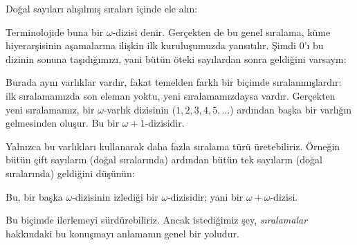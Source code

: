 


Doğal sayıları alışılmış sıraları içinde ele alın:
\begin{center}
\end{center}
Terminolojide buna bir $\omega$-dizisi denir. Gerçekten de bu genel
sıralama, küme hiyerarşisinin aşamalarına ilişkin ilk kuruluşumuzda
yansıtılır. Şimdi $0$'ı bu dizinin sonuna taşıdığımızı, yani bütün öteki
sayılardan sonra geldiğini varsayın:
\begin{center}
\end{center}
Burada aynı varlıklar vardır, fakat temelden farklı bir biçimde
sıralanmışlardır: ilk sıralamamızda son eleman yoktu, yeni sıralamamızdaysa
vardır. Gerçekten yeni sıralamamız, bir $\omega$-varlık dizisinin
($1,2,3,4,5,\ldots$) ardından başka bir varlığın gelmesinden oluşur. Bu
bir $\omega+1$-dizisidir.

Yalnızca bu varlıkları kullanarak daha fazla sıralama türü üretebiliriz.
Örneğin bütün çift sayıların (doğal sıralarında) ardından bütün tek
sayıların (doğal sıralarında) geldiğini düşünün:
\begin{center}
\end{center}
Bu, bir başka $\omega$-dizisinin izlediği bir $\omega$-dizisidir; yani
bir $\omega+\omega$-dizisi.

Bu biçimde ilerlemeyi sürdürebiliriz. Ancak istediğimiz şey,
\emph{sıralamalar} hakkındaki bu konuşmayı anlamanın genel bir yoludur.

